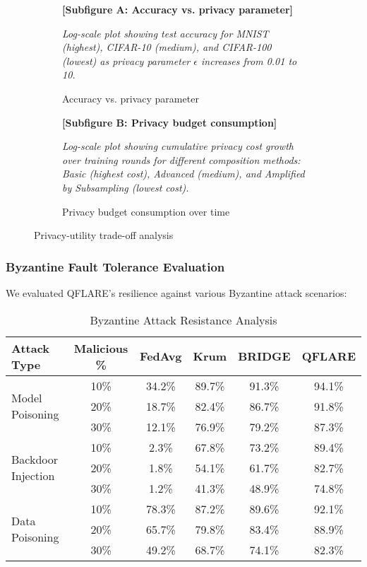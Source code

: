 \documentclass[onecolumn,11pt]{article}
\begin{document}
\begin{figure}[htbp]
\centering
\begin{subfigure}{0.48\textwidth}
\textbf{[Subfigure A: Accuracy vs. privacy parameter]}

\textit{Log-scale plot showing test accuracy for MNIST (highest), CIFAR-10 (medium), and CIFAR-100 (lowest) as privacy parameter $\epsilon$ increases from 0.01 to 10.}
\caption{Accuracy vs. privacy parameter}
\end{subfigure}
\hfill
\begin{subfigure}{0.48\textwidth}
\textbf{[Subfigure B: Privacy budget consumption]}

\textit{Log-scale plot showing cumulative privacy cost growth over training rounds for different composition methods: Basic (highest cost), Advanced (medium), and Amplified by Subsampling (lowest cost).}
\caption{Privacy budget consumption over time}
\end{subfigure}
\caption{Privacy-utility trade-off analysis}
\end{figure}

\subsubsection{Byzantine Fault Tolerance Evaluation}

We evaluated QFLARE's resilience against various Byzantine attack scenarios:

\begin{table}[htbp]
\centering
\caption{Byzantine Attack Resistance Analysis}
\begin{tabular}{|l|c|c|c|c|c|}
\hline
\textbf{Attack Type} & \textbf{Malicious \%} & \textbf{FedAvg} & \textbf{Krum} & \textbf{BRIDGE} & \textbf{QFLARE} \\
\hline
\multirow{3}{*}{Model Poisoning} & 10\% & 34.2\% & 89.7\% & 91.3\% & 94.1\% \\
& 20\% & 18.7\% & 82.4\% & 86.7\% & 91.8\% \\
& 30\% & 12.1\% & 76.9\% & 79.2\% & 87.3\% \\
\hline
\multirow{3}{*}{Backdoor Injection} & 10\% & 2.3\% & 67.8\% & 73.2\% & 89.4\% \\
& 20\% & 1.8\% & 54.1\% & 61.7\% & 82.7\% \\
& 30\% & 1.2\% & 41.3\% & 48.9\% & 74.8\% \\
\hline
\multirow{3}{*}{Data Poisoning} & 10\% & 78.3\% & 87.2\% & 89.6\% & 92.1\% \\
& 20\% & 65.7\% & 79.8\% & 83.4\% & 88.9\% \\
& 30\% & 49.2\% & 68.7\% & 74.1\% & 82.3\% \\
\hline
\end{tabular}
\end{table}
\end{document}
